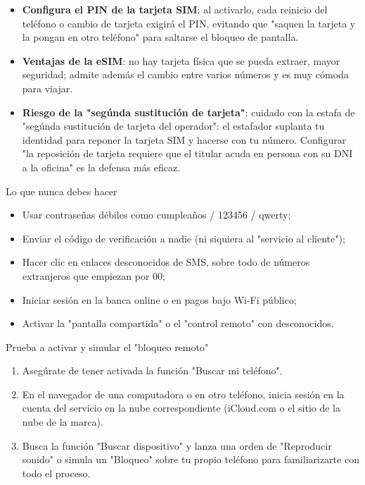 \begin{itemize}
  \item \textbf{Configura el PIN de la tarjeta SIM}: al activarlo, cada reinicio del teléfono o cambio de tarjeta exigirá el PIN, evitando que "saquen la tarjeta y la pongan en otro teléfono" para saltarse el bloqueo de pantalla.
  \item \textbf{Ventajas de la eSIM}: no hay tarjeta física que se pueda extraer, mayor seguridad; admite además el cambio entre varios números y es muy cómoda para viajar.
  \item \textbf{Riesgo de la "segúnda sustitución de tarjeta"}: cuidado con la estafa de "segúnda sustitución de tarjeta del operador": el estafador suplanta tu identidad para reponer la tarjeta SIM y hacerse con tu número. Configurar "la reposición de tarjeta requiere que el titular acuda en persona con su DNI a la oficina" es la defensa más eficaz.
\end{itemize}

\begin{tcbwarn}{Lo que nunca debes hacer}
\begin{itemize}
  \item Usar contraseñas débiles como cumpleaños / 123456 / qwerty;
  \item Enviar el código de verificación a nadie (ni siquiera al "servicio al cliente");
  \item Hacer clic en enlaces desconocidos de SMS, sobre todo de números extranjeros que empiezan por 00;
  \item Iniciar sesión en la banca online o en pagos bajo Wi-Fi público;
  \item Activar la "pantalla compartida" o el "control remoto" con desconocidos.
\end{itemize}

\end{tcbwarn}

\begin{tcbpractice}{Prueba a activar y simular el "bloqueo remoto"}
\begin{enumerate}
  \item Asegúrate de tener activada la función "Buscar mi teléfono".
  \item En el navegador de una computadora o en otro teléfono, inicia sesión en la cuenta del servicio en la nube correspondiente (iCloud.com o el sitio de la nube de la marca).
  \item Busca la función "Buscar dispositivo" y lanza una orden de "Reproducir sonido" o simula un "Bloqueo" sobre tu propio teléfono para familiarizarte con todo el proceso.
\end{enumerate}

\end{tcbpractice}

